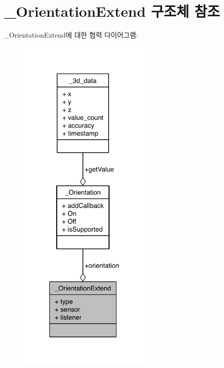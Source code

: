 \hypertarget{struct___orientation_extend}{\section{\-\_\-\-Orientation\-Extend 구조체 참조}
\label{struct___orientation_extend}
}


\-\_\-\-Orientation\-Extend에 대한 협력 다이어그램\-:\nopagebreak
\begin{figure}[H]
\begin{center}
\leavevmode
\includegraphics[width=185pt]{d5/d1f/struct___orientation_extend__coll__graph}
\end{center}
\end{figure}
